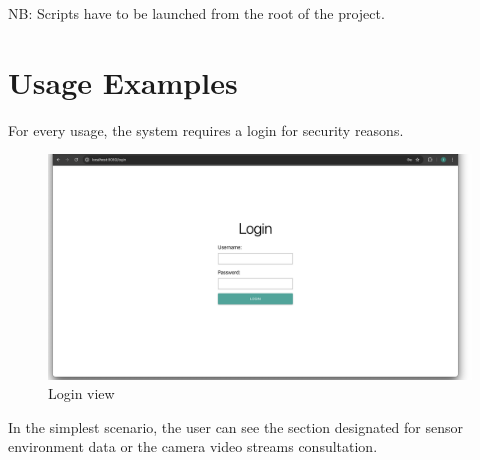 \documentclass{scrartcl}
\begin{document}
    NB: Scripts have to be launched from the root of the project.

    \section{Usage Examples}

    For every usage, the system requires a login for security reasons.

    \begin{figure}
        \centering
        \includegraphics[scale=0.25]{img/usage/login_view}
        \caption{Login view}
        \label{fig:login-view}
    \end{figure}

    In the simplest scenario, the user can see the section designated for sensor environment data or the camera video streams consultation.
\end{document}
